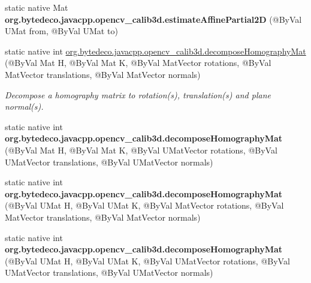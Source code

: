 \begin{DoxyCompactItemize}
static native Mat {\bfseries org.\+bytedeco.\+javacpp.\+opencv\+\_\+calib3d.\+estimate\+Affine\+Partial2D} (@By\+Val U\+Mat from, @By\+Val U\+Mat to)
\item 
static native int \hyperlink{group__calib3d_gac6a35d2f8ad957af40b439f4b0a6aad6}{org.\+bytedeco.\+javacpp.\+opencv\+\_\+calib3d.\+decompose\+Homography\+Mat} (@By\+Val Mat H, @By\+Val Mat K, @By\+Val Mat\+Vector rotations, @By\+Val Mat\+Vector translations, @By\+Val Mat\+Vector normals)
\begin{DoxyCompactList}\small\item\em Decompose a homography matrix to rotation(s), translation(s) and plane normal(s). \end{DoxyCompactList}\item 
\mbox{\label{group__calib3d_ga1aeaac250b90e6c79141a7493060c194}} 
static native int {\bfseries org.\+bytedeco.\+javacpp.\+opencv\+\_\+calib3d.\+decompose\+Homography\+Mat} (@By\+Val Mat H, @By\+Val Mat K, @By\+Val U\+Mat\+Vector rotations, @By\+Val U\+Mat\+Vector translations, @By\+Val U\+Mat\+Vector normals)
\item 
\mbox{\label{group__calib3d_ga2de792b5b987d80be90d28c7cc9ade61}} 
static native int {\bfseries org.\+bytedeco.\+javacpp.\+opencv\+\_\+calib3d.\+decompose\+Homography\+Mat} (@By\+Val U\+Mat H, @By\+Val U\+Mat K, @By\+Val Mat\+Vector rotations, @By\+Val Mat\+Vector translations, @By\+Val Mat\+Vector normals)
\item 
\mbox{\label{group__calib3d_gab1e047400f367443248333580bb05063}} 
static native int {\bfseries org.\+bytedeco.\+javacpp.\+opencv\+\_\+calib3d.\+decompose\+Homography\+Mat} (@By\+Val U\+Mat H, @By\+Val U\+Mat K, @By\+Val U\+Mat\+Vector rotations, @By\+Val U\+Mat\+Vector translations, @By\+Val U\+Mat\+Vector normals)
\end{DoxyCompactItemize}
